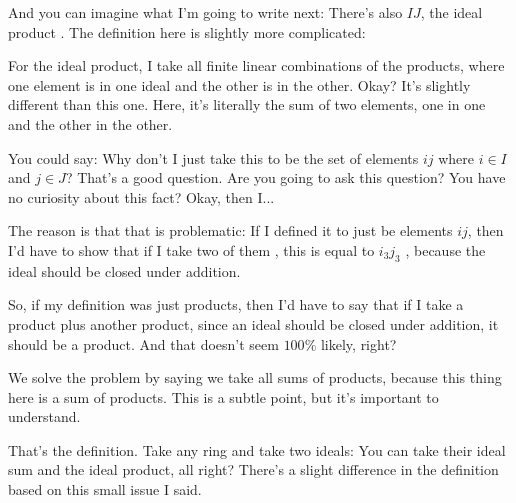 \begin{speech}[01:12:09 - 01:14:40]
And you can imagine what I'm going to write next: There's also $IJ$, the ideal product . The definition here is slightly more complicated: 

For the ideal product, I take all finite linear combinations of the products, where one element is in one ideal and the other is in the other. Okay? It's slightly different than this one. Here, it's literally the sum of two elements, one in one and the other in the other.

You could say: Why don't I just take this to be the set of elements $ij$ where $i \in I$ and $j \in J$? That's a good question. Are you going to ask this question? You have no curiosity about this fact? Okay, then I... 

The reason is that that is problematic: If I defined it to just be elements $ij$, then I'd have to show that if I take two of them , this is equal to $i_3 j_3$ , because the ideal should be closed under addition.

So, if my definition was just products, then I'd have to say that if I take a product plus another product, since an ideal should be closed under addition, it should be a product. And that doesn't seem $100\%$ likely, right?

We solve the problem by saying we take all sums of products, because this thing here is a sum of products. This is a subtle point, but it's important to understand.

That's the definition. Take any ring and take two ideals: You can take their ideal sum and the ideal product, all right? There's a slight difference in the definition based on this small issue I said.
\end{speech}

